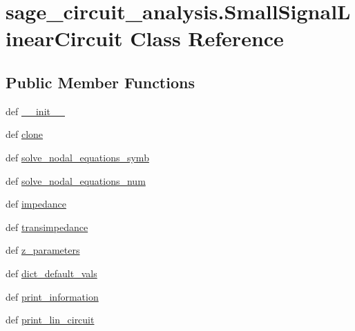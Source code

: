 \hypertarget{classsage__circuit__analysis_1_1SmallSignalLinearCircuit}{\section{sage\-\_\-circuit\-\_\-analysis.\-Small\-Signal\-Linear\-Circuit Class Reference}
\label{classsage__circuit__analysis_1_1SmallSignalLinearCircuit}
}
\subsection*{Public Member Functions}
\begin{DoxyCompactItemize}
\item 
def \hyperlink{classsage__circuit__analysis_1_1SmallSignalLinearCircuit_a0f30f016489667a4704544306abe456d}{\-\_\-\-\_\-init\-\_\-\-\_\-}
\item 
def \hyperlink{classsage__circuit__analysis_1_1SmallSignalLinearCircuit_aeafe17db122efcb3d3f745192294a071}{clone}
\item 
def \hyperlink{classsage__circuit__analysis_1_1SmallSignalLinearCircuit_ae7f58ba8a7203ea441675341dc1f30ca}{solve\-\_\-nodal\-\_\-equations\-\_\-symb}
\item 
def \hyperlink{classsage__circuit__analysis_1_1SmallSignalLinearCircuit_add2f95c8b64b32634a740065050a8bfa}{solve\-\_\-nodal\-\_\-equations\-\_\-num}
\item 
def \hyperlink{classsage__circuit__analysis_1_1SmallSignalLinearCircuit_a8cd930bc0a3a289fc228ffd93eab6eac}{impedance}
\item 
def \hyperlink{classsage__circuit__analysis_1_1SmallSignalLinearCircuit_a99eec5cf22c2386890dce8dec5b52cda}{transimpedance}
\item 
def \hyperlink{classsage__circuit__analysis_1_1SmallSignalLinearCircuit_a839630f7334fe6977c46e262a36ed6ca}{z\-\_\-parameters}
\item 
def \hyperlink{classsage__circuit__analysis_1_1SmallSignalLinearCircuit_a25ddb5c3ab3e8eb469f902fd38cb416b}{dict\-\_\-default\-\_\-vals}
\item 
def \hyperlink{classsage__circuit__analysis_1_1SmallSignalLinearCircuit_a14e7ed8816cd597b144bff47065ea653}{print\-\_\-information}
\item 
def \hyperlink{classsage__circuit__analysis_1_1SmallSignalLinearCircuit_ae97653d935fec765536c343a0827bafb}{print\-\_\-lin\-\_\-circuit}
\item 

\end{DoxyCompactItemize}

